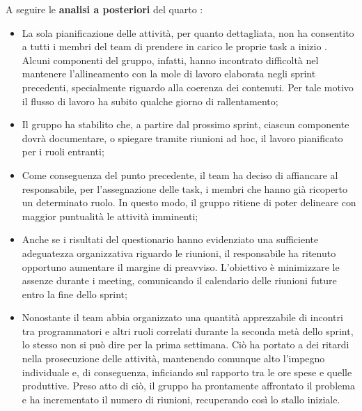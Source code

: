 \vspace{0.5\baselineskip}
\par A seguire le \textbf{analisi a posteriori} del quarto :
\begin{itemize}
  \item La sola pianificazione delle attività, per quanto dettagliata, non ha consentito a tutti i membri del team di prendere in carico le proprie task a inizio . Alcuni componenti del gruppo, infatti, hanno incontrato difficoltà nel mantenere l'allineamento con la mole di lavoro elaborata negli sprint precedenti, specialmente riguardo alla coerenza dei contenuti. Per tale motivo il flusso di lavoro ha subito qualche giorno di rallentamento;
\item Il gruppo ha stabilito che, a partire dal prossimo sprint, ciascun componente dovrà documentare, o spiegare tramite riunioni ad hoc, il lavoro pianificato per i ruoli entranti;
  \item Come conseguenza del punto precedente, il team ha deciso di affiancare al responsabile, per l'assegnazione delle task, i membri che hanno già ricoperto un determinato ruolo. In questo modo, il gruppo ritiene di poter delineare con maggior puntualità le attività imminenti;
  \item Anche se i risultati del questionario hanno evidenziato una sufficiente adeguatezza organizzativa riguardo le riunioni, il responsabile ha ritenuto opportuno aumentare il margine di preavviso. L'obiettivo è minimizzare le assenze durante i meeting, comunicando il calendario delle riunioni future entro la fine dello sprint;
  \item Nonostante il team abbia organizzato una quantità apprezzabile di incontri tra programmatori e altri ruoli correlati durante la seconda metà dello sprint, lo stesso non si può dire per la prima settimana. Ciò ha portato a dei ritardi nella prosecuzione delle attività, mantenendo comunque alto l'impegno individuale e, di conseguenza, inficiando sul rapporto tra le ore spese e quelle produttive. Preso atto di ciò, il gruppo ha prontamente affrontato il problema e ha incrementato il numero di riunioni, recuperando così lo stallo iniziale.
\end{itemize}

